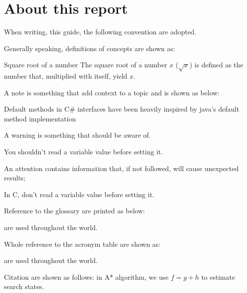 \chapter{About this report}

When writing, this guide, the following convention are adopted.

Generally speaking, definitions of concepts are shown as:

\begin{definition}{Square root of a number}
    The square root of a number $x$ ($\sqrt{x}$) is defined as the number that, multiplied with itself, yield $x$.
\end{definition}

A note is something that add context to a topic and is shown as below:

\begin{info}
    Default methods in C\# interfaces have been heavily inspired by java's default method implementation
\end{info}

A warning is something that should be aware of.

\begin{warning}
    You shouldn't read a variable value before setting it.
\end{warning}

An attention contains information that, if not followed, will cause unexpected results;

\begin{attention}
    In C, don't read a variable value before setting it.
\end{attention}

Reference to the glossary are printed as below:

 are used throughout the world.

Whole reference to the acronym table are shown as:

 are used throughout the world.

Citation are shown as follows: in A* algorithm, we use $f=g+h$ to estimate search states\cite{hart1968-astar}.
